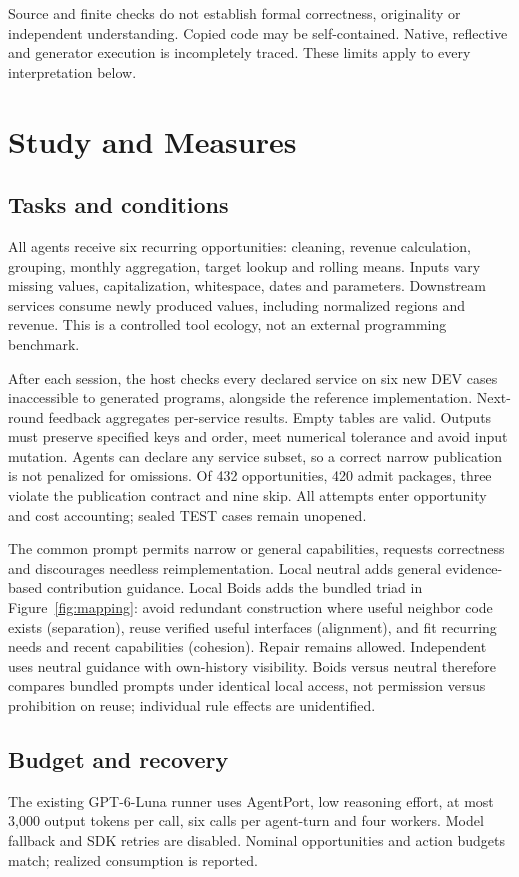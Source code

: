 \documentclass[sigconf,anonymous]{aamas}
\newcommand{\neutralname}{\textcolor{NeutralBlue}{Local neutral}}
\newcommand{\boidsname}{\textcolor{BoidsOrange}{Local Boids}}
\newcommand{\independentname}{\textcolor{IndependentGray}{Independent}}
\begin{document}
Source and finite checks do not establish formal correctness, originality or independent understanding. Copied code may be self-contained. Native, reflective and generator execution is incompletely traced. These limits apply to every interpretation below.

\section{Study and Measures}\label{sec:design}
\subsection{Tasks and conditions}
All agents receive six recurring opportunities: cleaning, revenue calculation, grouping, monthly aggregation, target lookup and rolling means. Inputs vary missing values, capitalization, whitespace, dates and parameters. Downstream services consume newly produced values, including normalized regions and revenue. This is a controlled tool ecology, not an external programming benchmark.

After each session, the host checks every declared service on six new DEV cases inaccessible to generated programs, alongside the reference implementation. Next-round feedback aggregates per-service results. Empty tables are valid. Outputs must preserve specified keys and order, meet numerical tolerance and avoid input mutation. Agents can declare any service subset, so a correct narrow publication is not penalized for omissions. Of 432 opportunities, 420 admit packages, three violate the publication contract and nine skip. All attempts enter opportunity and cost accounting; sealed TEST cases remain unopened.

The common prompt permits narrow or general capabilities, requests correctness and discourages needless reimplementation. \neutralname{} adds general evidence-based contribution guidance. \boidsname{} adds the bundled triad in Figure~\ref{fig:mapping}: avoid redundant construction where useful neighbor code exists (separation), reuse verified useful interfaces (alignment), and fit recurring needs and recent capabilities (cohesion). Repair remains allowed. \independentname{} uses neutral guidance with own-history visibility. Boids versus neutral therefore compares bundled prompts under identical local access, not permission versus prohibition on reuse; individual rule effects are unidentified.


\subsection{Budget and recovery}
The existing GPT-6-Luna runner uses AgentPort, low reasoning effort, at most 3,000 output tokens per call, six calls per agent-turn and four workers. Model fallback and SDK retries are disabled. Nominal opportunities and action budgets match; realized consumption is reported.
\end{document}
